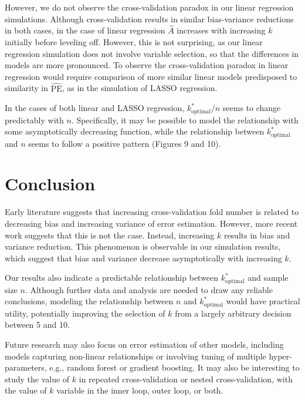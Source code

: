\documentclass[
  12pt,
]{article}
\begin{document}
However, we do not observe the cross-validation paradox in our linear
regression simulations. Although cross-validation results in similar
bias-variance reductions in both cases, in the case of linear regression
\(\hat{A}\) increases with increasing \(k\) initially before leveling
off. However, this is not surprising, as our linear regression
simulation does not involve variable selection, so that the differences
in models are more pronounced. To observe the cross-validation paradox
in linear regression would require comparison of more similar linear
models predisposed to similarity in \(\widehat{\mathrm{PE}}\), as in the
simulation of LASSO regression.

In the cases of both linear and LASSO regression,
\(k_\mathrm{optimal}^*/n\) seems to change predictably with \(n\).
Specifically, it may be possible to model the relationship with some
asymptotically decreasing function, while the relationship between
\(k_\mathrm{optimal}^*\) and \(n\) seems to follow a positive pattern
(Figures 9 and 10).

\hypertarget{conclusion}{%
\section{Conclusion}\label{conclusion}}

Early literature suggests that increasing cross-validation fold number
is related to decreasing bias and increasing variance of error
estimation. However, more recent work suggests that this is not the
case. Instead, increasing \(k\) results in bias and variance reduction.
This phenomenon is observable in our simulation results, which suggest
that bias and variance decrease asymptotically with increasing \(k\).

Our results also indicate a predictable relationship between
\(k_\mathrm{optimal}^*\) and sample size \(n\). Although further data
and analysis are needed to draw any reliable conclusions, modeling the
relationship between \(n\) and \(k_\mathrm{optimal}^*\) would have
practical utility, potentially improving the selection of \(k\) from a
largely arbitrary decision between 5 and 10.

Future research may also focus on error estimation of other models,
including models capturing non-linear relationships or involving tuning
of multiple hyper-parameters, e.g., random forest or gradient boosting.
It may also be interesting to study the value of \(k\) in repeated
cross-validation or nested cross-validation, with the value of \(k\)
variable in the inner loop, outer loop, or both.
\end{document}
